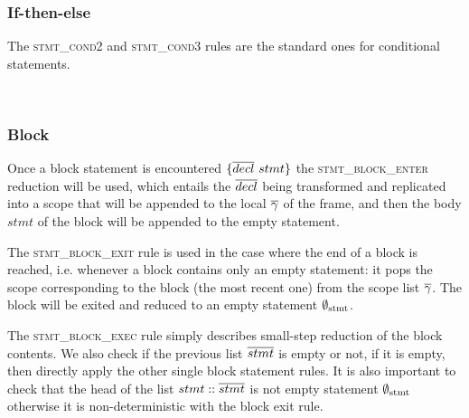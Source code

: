 \documentclass[UTF8]{article}
\begin{document}
\begin{figure}[ht!]
    \ottusedrule{\ottdrulestmtXXassXXv{}}
\end{figure}

\subsubsection*{If-then-else}
The \textsc{stmt\_cond2} and \textsc{stmt\_cond3} rules are the standard ones for conditional statements.

\begin{figure}[ht!]
    \ottusedrule{\ottdrulestmtXXcondTwo{}} \\
    \ottusedrule{\ottdrulestmtXXcondThree{}} 
\end{figure}


\subsubsection*{Block}
Once a block statement is encountered $ \{ \overline{decl} \ stmt \}$ the \textsc{stmt\_block\_enter} reduction will be used, which entails the $\overline{decl}{}$ being transformed and replicated into a scope that will be appended to the local $\overline{\gamma}{}$ of the frame, and then the body $stmt$ of the block will be appended to the empty statement.


The \textsc{stmt\_block\_exit} rule is used in the case where the end of a block is reached, i.e. whenever a block contains only an empty statement: it pops the scope corresponding to the block (the most recent one) from the scope list $\overline{\gamma}$. The block will be exited and reduced to an empty statement $\emptyset_{ \mathrm{stmt} }{}$.


The \textsc{stmt\_block\_exec} rule simply describes small-step reduction of the block contents. We also check if the previous list $\overline{stmt}$ is empty or not, if it is empty, then directly apply the other single block statement rules. It is also important to check that the head of the list $stmt::\overline{stmt}$ is not empty statement $\emptyset_{ \mathrm{stmt} }{}$ otherwise it is non-deterministic with the block exit rule.

\begin{figure}[ht!]
    \ottusedrule{\ottdrulestmtXXblockXXenter{}} \\
    \ottusedrule{\ottdrulestmtXXblockXXexec{}} \\
    \ottusedrule{\ottdrulestmtXXblockXXexit{}} 
\end{figure}
\end{document}
